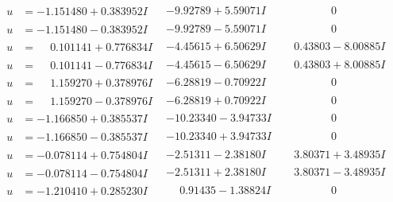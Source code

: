 \documentclass[1p]{elsarticle_modified}
\theoremstyle{definition}
\begin{document}
$$\begin{array}{c|c|c}
\begin{aligned}
u &= -1.151480 + 0.383952 I\end{aligned}
 & -9.92789 + 5.59071 I & \phantom{-0.000000 } 0 \\ \hline\begin{aligned}
u &= -1.151480 - 0.383952 I\end{aligned}
 & -9.92789 - 5.59071 I & \phantom{-0.000000 } 0 \\ \hline\begin{aligned}
u &= \phantom{-}0.101141 + 0.776834 I\end{aligned}
 & -4.45615 + 6.50629 I & \phantom{-}0.43803 - 8.00885 I \\ \hline\begin{aligned}
u &= \phantom{-}0.101141 - 0.776834 I\end{aligned}
 & -4.45615 - 6.50629 I & \phantom{-}0.43803 + 8.00885 I \\ \hline\begin{aligned}
u &= \phantom{-}1.159270 + 0.378976 I\end{aligned}
 & -6.28819 - 0.70922 I & \phantom{-0.000000 } 0 \\ \hline\begin{aligned}
u &= \phantom{-}1.159270 - 0.378976 I\end{aligned}
 & -6.28819 + 0.70922 I & \phantom{-0.000000 } 0 \\ \hline\begin{aligned}
u &= -1.166850 + 0.385537 I\end{aligned}
 & -10.23340 - 3.94733 I & \phantom{-0.000000 } 0 \\ \hline\begin{aligned}
u &= -1.166850 - 0.385537 I\end{aligned}
 & -10.23340 + 3.94733 I & \phantom{-0.000000 } 0 \\ \hline\begin{aligned}
u &= -0.078114 + 0.754804 I\end{aligned}
 & -2.51311 - 2.38180 I & \phantom{-}3.80371 + 3.48935 I \\ \hline\begin{aligned}
u &= -0.078114 - 0.754804 I\end{aligned}
 & -2.51311 + 2.38180 I & \phantom{-}3.80371 - 3.48935 I \\ \hline\begin{aligned}
u &= -1.210410 + 0.285230 I\end{aligned}
 & \phantom{-}0.91435 - 1.38824 I & \phantom{-0.000000 } 0 \\ \hline\begin{aligned}

\end{aligned}
\end{array}$$
\end{document}
